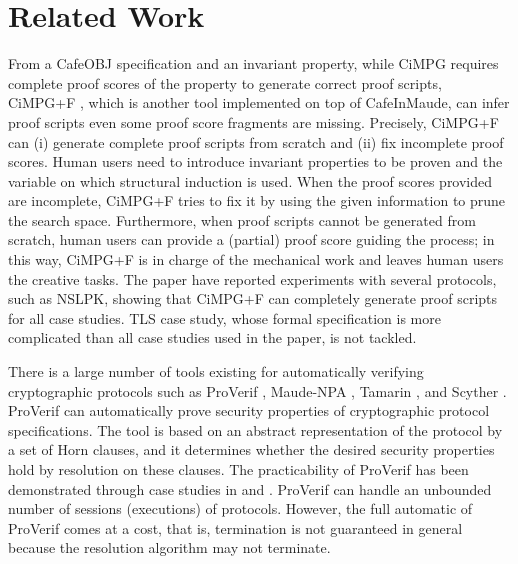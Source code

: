 \documentclass[a4paper,fleqn]{cas-dc}
\begin{document}
\section{Related Work}\label{relatedwork}
From a CafeOBJ specification and an invariant property,
while CiMPG requires complete proof scores of the property to generate correct proof scripts,
CiMPG+F \cite{Riesco20}, which is another tool implemented on top of CafeInMaude,
can infer proof scripts even some proof score fragments are missing.
Precisely, CiMPG+F can (i) generate complete proof scripts from scratch and (ii) fix incomplete proof scores.
Human users need to introduce invariant properties to be proven and the variable on which structural induction is used.
When the proof scores provided are incomplete, CiMPG+F tries to fix it by using the given information to prune the search space.
Furthermore, when proof scripts cannot be generated from scratch, human users can provide a (partial) proof score guiding the process; in this way, CiMPG+F is in charge of the mechanical work and leaves human users the creative tasks.
The paper \cite{Riesco20} have reported experiments with several protocols, such as NSLPK, showing that CiMPG+F can completely generate proof scripts for all case studies.
TLS case study, whose formal specification is more complicated than all case studies used in the paper, is not tackled.


There is a large number of tools existing for automatically verifying cryptographic protocols such as ProVerif \cite{proverif}, Maude-NPA \cite{maudenpa}, Tamarin \cite{tamarin}, and Scyther \cite{Scyther08}.
ProVerif can automatically prove security properties of cryptographic protocol specifications.
The tool is based on an abstract representation of the protocol by a set of Horn clauses,
and it determines whether the desired security properties hold by resolution on these clauses.
The practicability of ProVerif has been demonstrated through case studies in \cite{proverif2} and \cite{proverif3}. 
ProVerif can handle an unbounded number of sessions (executions) of protocols. 
However, the full automatic of ProVerif comes at a cost, that is, termination is not guaranteed in general because the resolution algorithm may not terminate. 
\end{document}
